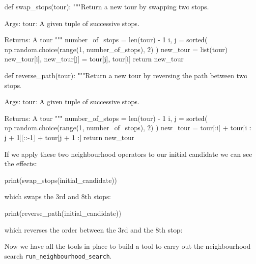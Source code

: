 \begin{pyin}
def swap_stops(tour):
    """Return a new tour by swapping two stops.

    Args:
        tour: A given tuple of successive stops.

    Returns:
        A tour
    """
    number_of_stops = len(tour) - 1
    i, j = sorted(
        np.random.choice(range(1, number_of_stops), 2)
    )
    new_tour = list(tour)
    new_tour[i], new_tour[j] = tour[j], tour[i]
    return new_tour


def reverse_path(tour):
    """Return a new tour by reversing the path between two
    stops.

    Args:
        tour: A given tuple of successive stops.

    Returns:
        A tour
    """
    number_of_stops = len(tour) - 1
    i, j = sorted(
        np.random.choice(range(1, number_of_stops), 2)
    )
    new_tour = tour[:i] + tour[i : j + 1][::-1] + tour[j + 1 :]
    return new_tour
\end{pyin}

If we apply these two neighbourhood operators to our initial candidate we can
see the effects:

\begin{pyin}
print(swap_stops(initial_candidate))
\end{pyin}

which swaps the 3rd and 8th stops:

\begin{pyout}
[0, 7, 12, 5, 11, 3, 9, 2, 8, 1, 4, 10, 6, 0]
\end{pyout}

\begin{pyin}
print(reverse_path(initial_candidate))
\end{pyin}

which reverses the order between the 3rd and the 8th stop:

\begin{pyout}
[0, 7, 2, 9, 3, 11, 5, 12, 8, 10, 4, 1, 6, 0]
\end{pyout}

Now we have all the tools in place to build a tool to carry out the
neighbourhood search \texttt{run_neighbourhood_search}.

